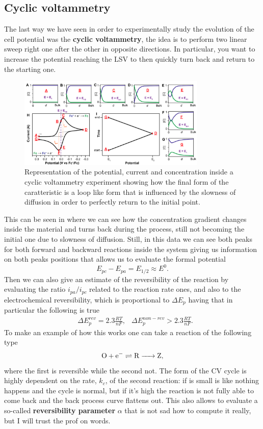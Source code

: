 \subsection{Cyclic voltammetry}
The last way we have seen in order to experimentally study the evolution of the cell potential was the \textbf{cyclic voltammetry}, the idea is to perform two linear sweep right one after the other in opposite directions. In particular, you want to increase the potential reaching the LSV to then quickly turn back and return to the starting one. 
\begin{figure}[t]
    \centering
    \includegraphics[width=0.8\textwidth]{Immagini/CyclicVoltam.png}
    \caption{
        Representation of the potential, current and concentration inside a cyclic voltammetry experiment showing how the final form of the caratteristic is a loop like form that is influenced by the slowness of diffusion in order to perfectly return to the initial point.
    }
    \label{fig:CyclicVoltam}
\end{figure}
This can be seen in  where we can see how the concentration gradient changes inside the material and turns back during the process, still not becoming the initial one due to slowness of diffusion. Still, in this data we can see both peaks for both forward and backward reactions inside the system giving us information on both peaks positions that allows us to evaluate the formal potential
\begin{equation}
    E_{pc} - E_{pa} = E_{1/2} \approx E^0.
\end{equation} 
Then we can also give an estimate of the reversibility of the reaction by evaluating the ratio $i_{pa}/i_{pc}$ related to the reaction rate ones, and also to the electrochemical reversibility, which is proportional to $\Delta E_p$ having that in particular the following is true 
\begin{align}
    &\Delta E_p^{rev} = 2.3\frac{RT}{nF}, &\Delta E_p^{non-rev} > 2.3 \frac{RT}{nF}.
\end{align}
To make an example of how this works one can take a reaction of the following type
\begin{equation}
    \ce{O + e^-}\rightleftharpoons \ce{R -> Z}, 
\end{equation}
where the first is reversible while the second not. The form of the CV cycle is highly dependent on the rate, $k_c$, of the second reaction: if is small is like nothing happens and the cycle is normal, but if it's high the reaction is not fully able to come back and the back process curve flattens out. This also allows to evaluate a so-called \textbf{reversibility parameter} $\alpha$ that is not sad how to compute it really, but I will trust the prof on words.